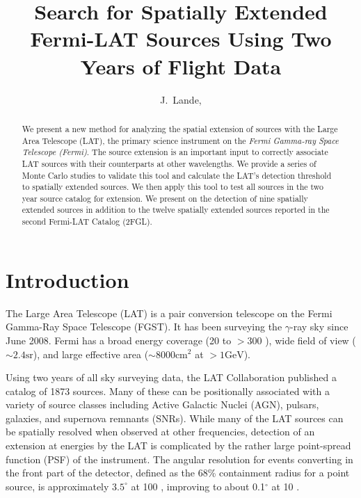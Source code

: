 \documentclass[12pt,preprint]{aastex}
\newcommand{\mev}{\text{MeV}\xspace}
\newcommand{\gev}{\text{GeV}\xspace}
\newcommand{\sr}{\text{sr}\xspace}
\newcommand{\cm}{\text{cm}\xspace}
\renewcommand{\approx}{\sim\!\xspace}
\begin{document}
\title{Search for Spatially Extended Fermi-LAT Sources Using Two Years of Flight
Data}

\author{
J.~Lande, 
}


\begin{abstract}
We present a new method for analyzing 
the spatial extension of sources with
the Large Area Telescope (LAT), the primary science instrument on the
{\em Fermi Gamma-ray Space Telescope (Fermi)}. 
The source extension is an important input to correctly 
associate LAT sources with their counterparts at other
wavelengths. We provide
a series of Monte Carlo studies to validate this tool and calculate
the LAT's detection threshold to spatially extended sources.  We then
apply this tool to test all sources in the two year source catalog for
extension. We present on the detection of nine spatially extended sources
in addition to the twelve spatially extended sources reported in the
second Fermi-LAT Catalog (2FGL).
\end{abstract}

\listoftodos

\section{Introduction}


The Large Area Telescope (LAT) is a pair conversion telescope on the Fermi
Gamma-Ray Space Telescope (FGST). It has been surveying the $\gamma$-ray
sky since June 2008.  Fermi has a broad energy coverage (20 \mev to $>300$
\gev), wide field of view ($\approx 2.4 \sr$), and large effective area
($\approx 8000 \cm^2$ at $>1 \gev$).

Using two years of all sky surveying data, the LAT Collaboration published
a catalog of 1873 \gev sources\cite{second_cat}. Many of these can be
positionally associated with a variety of source classes including Active
Galactic Nuclei (AGN), pulsars, galaxies, and supernova remnants (SNRs).
While many of the LAT sources can be spatially resolved when observed
at other frequencies, detection of an extension at \gev energies by
the LAT is complicated by the rather large point-spread function (PSF)
of the instrument. The angular resolution for events converting in the
front part of the detector, defined as the 68\% containment radius for
a point source, is approximately $3.5^{\circ}$ at 100 \mev, improving
to about 0.1$^{\circ}$ at 10 \gev.
\end{document}
